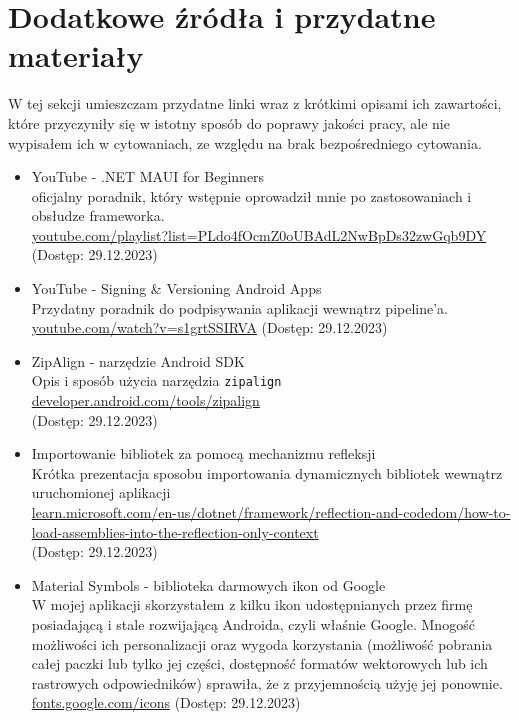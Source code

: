 \section{Dodatkowe źródła i przydatne materiały} \label{dodatkoweZrodla}
W tej sekcji umieszczam przydatne linki wraz z krótkimi opisami ich zawartości,
które przyczyniły się w istotny sposób do poprawy jakości pracy, ale nie wypisałem ich w cytowaniach,
ze względu na brak bezpośredniego cytowania.

\begin{itemize}
    \item YouTube - .NET MAUI for Beginners \\
        oficjalny poradnik, który wstępnie oprowadził mnie po zastosowaniach i ob\-słu\-dze frameworka. \\
        \href{https://youtube.com/playlist?list=PLdo4fOcmZ0oUBAdL2NwBpDs32zwGqb9DY}%
        {youtube.com/playlist?list=PLdo4fOcmZ0oUBAdL2NwBpDs32zwGqb9DY}\\
        (Dostęp: 29.12.2023)
    \item YouTube - Signing \& Versioning Android Apps\\
        Przydatny poradnik do podpisywania aplikacji wewnątrz pipeline'a.\\
        \href{https://youtube.com/watch?v=s1grtSSIRVA}{youtube.com/watch?v=s1grtSSIRVA}
        (Dostęp: 29.12.2023)
    \item ZipAlign - narzędzie Android SDK\\
        Opis i sposób użycia narzędzia \verb|zipalign| \\
        \href{https://developer.android.com/tools/zipalign}{developer.android.com/tools/zipalign}\\
        (Dostęp: 29.12.2023)
    \item Importowanie bibliotek za pomocą mechanizmu refleksji\\
        Krótka prezentacja sposobu importowania dynamicznych bibliotek wewnątrz uruchomionej aplikacji \\
        \href{https://learn.microsoft.com/en-us/dotnet/framework/reflection-and-codedom/how-to-load-assemblies-into-the-reflection-only-context}%
        {learn.microsoft.com/en-us/dotnet/framework/reflection-and-codedom/how-to-load-assemblies-into-the-reflection-only-context}\\
        (Dostęp: 29.12.2023)
    \item Material Symbols - biblioteka darmowych ikon od Google\\
        W mojej aplikacji skorzystałem z kilku ikon udostępnianych przez firmę posiadającą i stale 
        rozwijającą Androida, czyli właśnie Google. Mnogość możliwości ich personalizacji 
        oraz wygoda korzystania (możliwość pobrania całej paczki lub tylko jej części, 
        dostępność formatów wektorowych lub ich rastrowych odpowiedników) sprawiła, 
        że z przyjemnością użyję jej ponownie.
        \href{https://fonts.google.com/icons}{fonts.google.com/icons}
        (Dostęp: 29.12.2023)
\end{itemize}
